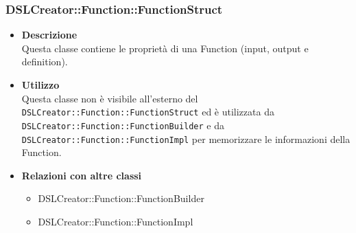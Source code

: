  \subsubsection{DSLCreator::Function::FunctionStruct}
                    \begin{itemize}
                        \item \textbf{Descrizione} \hfill \\
                          Questa classe contiene le proprietà di una Function (input, output e definition).
                        \item \textbf{Utilizzo} \hfill \\
                          Questa classe non è visibile all'esterno del  \texttt{DSLCreator::Function::FunctionStruct} ed è utilizzata da \texttt{DSLCreator::Function::FunctionBuilder} e da \texttt{DSLCreator::Fun\-ction::FunctionImpl} per memorizzare le informazioni della Function.
                        \item \textbf{Relazioni con altre classi}
                            \begin{itemize}
                              \item DSLCreator::Function::FunctionBuilder
                              \item DSLCreator::Function::FunctionImpl
                            \end{itemize}
                    \end{itemize}  
